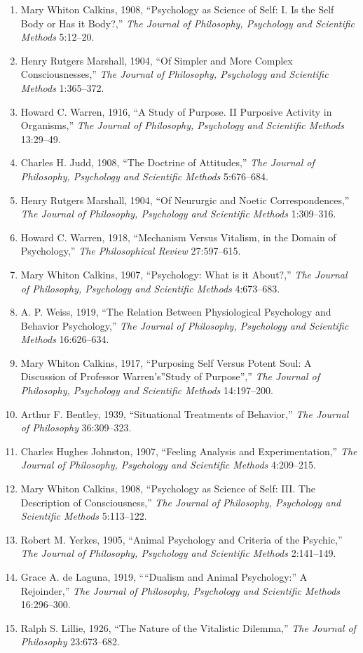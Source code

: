\documentclass[
]{article}
\begin{document}
\begin{enumerate}
\def\labelenumi{\arabic{enumi}.}
\item
  Mary Whiton Calkins, 1908, ``Psychology as Science of Self: I. Is the
  Self Body or Has it Body?,'' \emph{The Journal of Philosophy,
  Psychology and Scientific Methods} 5:12--20.
\item
  Henry Rutgers Marshall, 1904, ``Of Simpler and More Complex
  Consciousnesses,'' \emph{The Journal of Philosophy, Psychology and
  Scientific Methods} 1:365--372.
\item
  Howard C. Warren, 1916, ``A Study of Purpose. II Purposive Activity in
  Organisms,'' \emph{The Journal of Philosophy, Psychology and
  Scientific Methods} 13:29--49.
\item
  Charles H. Judd, 1908, ``The Doctrine of Attitudes,'' \emph{The
  Journal of Philosophy, Psychology and Scientific Methods} 5:676--684.
\item
  Henry Rutgers Marshall, 1904, ``Of Neururgic and Noetic
  Correspondences,'' \emph{The Journal of Philosophy, Psychology and
  Scientific Methods} 1:309--316.
\item
  Howard C. Warren, 1918, ``Mechanism Versus Vitalism, in the Domain of
  Psychology,'' \emph{The Philosophical Review} 27:597--615.
\item
  Mary Whiton Calkins, 1907, ``Psychology: What is it About?,''
  \emph{The Journal of Philosophy, Psychology and Scientific Methods}
  4:673--683.
\item
  A. P. Weiss, 1919, ``The Relation Between Physiological Psychology and
  Behavior Psychology,'' \emph{The Journal of Philosophy, Psychology and
  Scientific Methods} 16:626--634.
\item
  Mary Whiton Calkins, 1917, ``Purposing Self Versus Potent Soul: A
  Discussion of Professor Warren's''Study of Purpose'','' \emph{The
  Journal of Philosophy, Psychology and Scientific Methods} 14:197--200.
\item
  Arthur F. Bentley, 1939, ``Situational Treatments of Behavior,''
  \emph{The Journal of Philosophy} 36:309--323.
\item
  Charles Hughes Johnston, 1907, ``Feeling Analysis and
  Experimentation,'' \emph{The Journal of Philosophy, Psychology and
  Scientific Methods} 4:209--215.
\item
  Mary Whiton Calkins, 1908, ``Psychology as Science of Self: III. The
  Description of Consciousness,'' \emph{The Journal of Philosophy,
  Psychology and Scientific Methods} 5:113--122.
\item
  Robert M. Yerkes, 1905, ``Animal Psychology and Criteria of the
  Psychic,'' \emph{The Journal of Philosophy, Psychology and Scientific
  Methods} 2:141--149.
\item
  Grace A. de Laguna, 1919, ````Dualism and Animal Psychology:'' A
  Rejoinder,'' \emph{The Journal of Philosophy, Psychology and
  Scientific Methods} 16:296--300.
\item
  Ralph S. Lillie, 1926, ``The Nature of the Vitalistic Dilemma,''
  \emph{The Journal of Philosophy} 23:673--682.
\end{enumerate}
\end{document}
